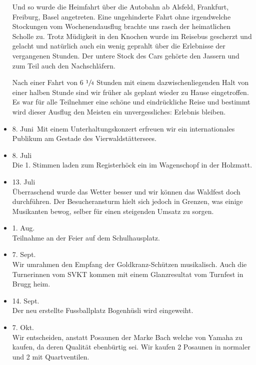 \begin{history}
\begin{itemize}
        Und so wurde die Heimfahrt über die Autobahn ab Alsfeld, Frankfurt,
        Freiburg, Basel angetreten. Eine ungehinderte Fahrt ohne irgendwelche
        Stockungen vom Wochenendausflug brachte uns rasch der heimatlichen
        Scholle zu. Trotz Müdigkeit in den Knochen wurde im Reisebus gescherzt
        und gelacht und natürlich auch ein wenig geprahlt über die Erlebnisse
        der vergangenen Stunden. Der untere Stock des Cars gehörte den Jassern
        und zum Teil auch den Nachschläfern.

        Nach einer Fahrt von 6 $\sfrac{1}{4}$ Stunden mit einem
        dazwischenliegenden Halt von einer halben Stunde sind wir früher als
        geplant wieder zu Hause eingetroffen. Es war für alle Teilnehmer eine
        schöne und eindrückliche Reise und bestimmt wird dieser Ausflug den
        Meisten ein unvergessliches: Erlebnis bleiben.

        \item[]8. Juni\ Mit einem Unterhaltungskonzert erfreuen wir ein
        internationales Publikum am Gestade des Vierwaldstättersees.

        \item[]8. Juli\\
        Die 1. Stimmen laden zum Registerhöck ein im Wagenschopf in der
        Holzmatt.

        \item[]13. Juli\\
        Überraschend wurde das Wetter besser und wir können das Waldfest doch
        durchführen. Der Besucheransturm hielt sich jedoch in Grenzen, was
        einige Musikanten bewog, selber für einen steigenden Umsatz zu sorgen.

        \item[]1. Aug.\\
        Teilnahme an der Feier auf dem Schulhausplatz.

        \item[]7. Sept.\\
        Wir umrahmen den Empfang der Goldkranz-Schützen musikalisch. Auch die
        Turnerinnen vom SVKT kommen mit einem Glanzresultat vom Turnfest in
        Brugg heim.

        \item[]14. Sept.\\
        Der neu erstellte Fussballplatz Bogenhüsli wird eingeweiht.

        \item[]7. Okt.\\
        Wir entscheiden, anstatt Posaunen der Marke Bach welche von Yamaha zu
        kaufen, da deren Qualität ebenbürtig sei. Wir kaufen 2 Posaunen in
        normaler und 2 mit Quartventilen.



    \end{itemize}

\end{history}
